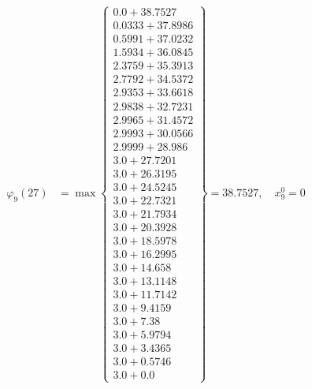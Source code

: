 \documentclass{article}
\begin{document}
\begin{align*}
  
\varphi_{9}(27) &= \max \left\{ \begin{array}{c}
0.0 + 38.7527 \\
 0.0333 + 37.8986 \\
 0.5991 + 37.0232 \\
 1.5934 + 36.0845 \\
 2.3759 + 35.3913 \\
 2.7792 + 34.5372 \\
 2.9353 + 33.6618 \\
 2.9838 + 32.7231 \\
 2.9965 + 31.4572 \\
 2.9993 + 30.0566 \\
 2.9999 + 28.986 \\
 3.0 + 27.7201 \\
 3.0 + 26.3195 \\
 3.0 + 24.5245 \\
 3.0 + 22.7321 \\
 3.0 + 21.7934 \\
 3.0 + 20.3928 \\
 3.0 + 18.5978 \\
 3.0 + 16.2995 \\
 3.0 + 14.658 \\
 3.0 + 13.1148 \\
 3.0 + 11.7142 \\
 3.0 + 9.4159 \\
 3.0 + 7.38 \\
 3.0 + 5.9794 \\
 3.0 + 3.4365 \\
 3.0 + 0.5746 \\
 3.0 + 0.0
\end{array} \right\}=38.7527,\quad x_{9}^0=0\\
  
  
  

\end{align*}
\end{document}
